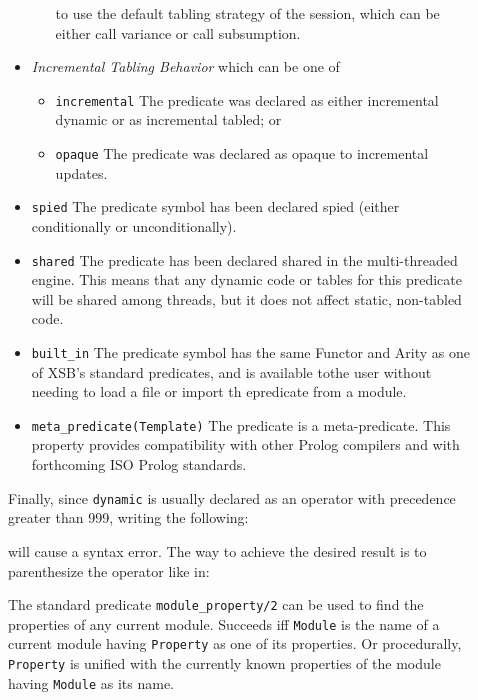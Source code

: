 \begin{description}
\begin{itemize}
\begin{itemize}
  to use the default tabling strategy of the session, which can be
  either call variance or call subsumption.
%
\end{itemize}
\item{\em Incremental Tabling Behavior} which can be one of 
\begin{itemize}
\item{\tt incremental} The predicate was declared as either
  incremental dynamic or as incremental tabled; or
%
\item{\tt opaque} The predicate was declared as opaque to incremental
  updates.
\end{itemize}
%
\item{\tt spied} The predicate symbol has been declared spied (either
  conditionally or unconditionally).
%
\item{\tt shared} The predicate has been declared shared in the
  multi-threaded engine.  This means that any dynamic code or tables
  for this predicate will be shared among threads, but it does not
  affect static, non-tabled code.  
%
\item{\tt built\_in} The predicate symbol has the same
  Functor and Arity as one of XSB's standard predicates, and is
  available tothe user without needing to load a file or import
  th epredicate from a module. 
%
%
\item{\tt meta\_predicate(Template)}  The
  predicate is a meta-predicate. This property provides
  compatibility with other Prolog compilers and with forthcoming
  ISO Prolog standards. 
\end{itemize}

    Finally, since {\tt dynamic} is usually declared as an operator with 
    precedence greater than 999, writing the following:


    will cause a syntax error. The way to achieve the desired result is to
    parenthesize the operator like in:



    The standard predicate {\tt module\_property/2} can be used to find the
    properties of any current module.
    Succeeds iff {\tt Module} is the name of a current module having 
    {\tt Property} as one of its properties. Or procedurally, {\tt Property}
    is unified with the currently known properties of the module having 
    {\tt Module} as its name.


\end{description}
